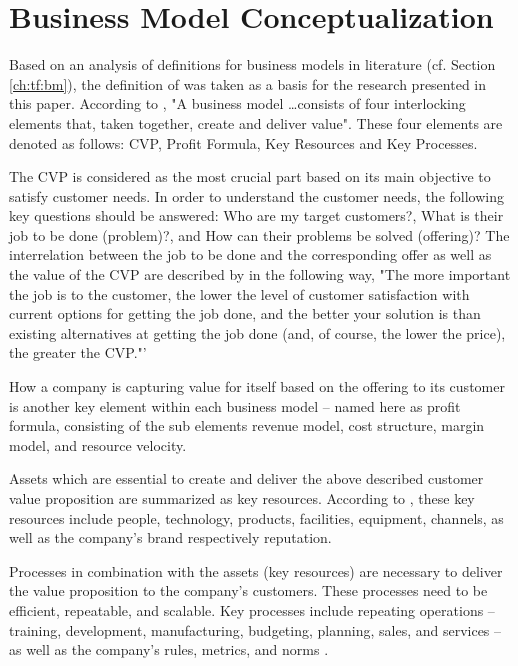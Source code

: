 	
	
\section{Business Model Conceptualization}\label{ch:sota:bmc}

Based on an analysis of definitions for business models in literature (cf. Section \ref{ch:tf:bm}), the definition of \citet{Johnson2008} was taken as a basis for the research presented in this paper. According to \citet[p. 52]{Johnson2008}, "A business model \ldots consists of four interlocking elements that, taken together, create and deliver value". These four elements are denoted as follows: \ac{CVP}, Profit Formula, Key Resources and Key Processes. 

The \ac{CVP} is considered as the most crucial part based on its main objective to satisfy customer needs. In order to understand the customer needs, the following key questions should be answered: Who are my target customers?, What is their job to be done (problem)?, and How can their problems be solved (offering)? The interrelation between the job to be done and the corresponding offer as well as the value of the \ac{CVP} are described by  \citet[p. 52]{Johnson2008} in the following way, "The more important the job is to the customer, the lower the level of customer satisfaction with current options for getting the job done, and the better your solution is than existing alternatives at getting the job done (and, of course, the lower the price), the greater the CVP."'

How a company is capturing value for itself based on the offering to its customer is another key element within each business model -- named here as profit formula, consisting of the sub elements revenue model, cost structure, margin model, and resource velocity.

Assets which are essential to create and deliver the above described customer value proposition are summarized as key resources. According to \citet[p. 53]{Johnson2008}, these key resources include people, technology, products, facilities, equipment, channels, as well as the company's brand respectively reputation.

Processes in combination with the assets (key resources) are necessary to deliver the value proposition to the company's customers. These processes need to be efficient, repeatable, and scalable. Key processes include repeating operations -- training, development, manufacturing, budgeting, planning, sales, and services -- as well as the company's rules, metrics, and norms \citep[p. 53]{Johnson2008}.

